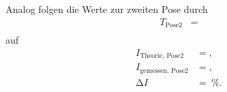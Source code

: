 Analog folgen die Werte zur zweiten Pose durch
\begin{align*}
  T_{\text{Pose2}}  &=  \\
\end{align*}
auf
\begin{align*}
  I_{\text{Theorie, Pose2}}   &= , \\
  I_{\text{gemessen, Pose2}}  &= , \\
  \increment I                 &= \:\si{\percent}. \\
\end{align*}




